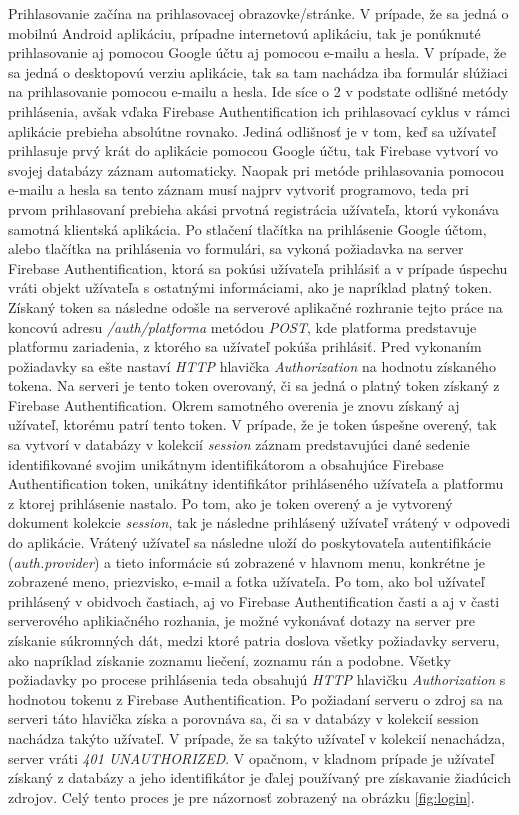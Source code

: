 Prihlasovanie začína na prihlasovacej obrazovke/stránke. V prípade, že sa jedná o mobilnú Android aplikáciu, prípadne internetovú aplikáciu, tak je ponúknuté prihlasovanie aj pomocou Google účtu aj pomocou e-mailu a hesla. V prípade, že sa jedná o desktopovú verziu aplikácie, tak sa tam nachádza iba formulár slúžiaci na prihlasovanie pomocou e-mailu a hesla. Ide síce o 2 v podstate odlišné metódy prihlásenia, avšak vďaka Firebase Authentification ich prihlasovací cyklus v rámci aplikácie prebieha absolútne rovnako. Jediná odlišnosť je v tom, keď sa užívateľ prihlasuje prvý krát do aplikácie pomocou Google účtu, tak Firebase vytvorí vo svojej databázy záznam automaticky. Naopak pri metóde prihlasovania pomocou e-mailu a hesla sa tento záznam musí najprv vytvoriť programovo, teda pri prvom prihlasovaní prebieha akási prvotná registrácia užívateľa, ktorú vykonáva samotná klientská aplikácia. Po stlačení tlačítka na prihlásenie Google účtom, alebo tlačítka na prihlásenia vo formulári, sa vykoná požiadavka na server Firebase Authentification, ktorá sa pokúsi užívateľa prihlásiť a v prípade úspechu vráti objekt užívateľa s ostatnými informáciami, ako je napríklad platný token. Získaný token sa následne odošle na serverové aplikačné rozhranie tejto práce na koncovú adresu \textit{/auth/platforma} metódou \textit{POST}, kde platforma predstavuje platformu zariadenia, z ktorého sa užívateľ pokúša prihlásiť. Pred vykonaním požiadavky sa ešte nastaví \textit{HTTP} hlavička \textit{Authorization} na hodnotu získaného tokena. Na serveri je tento token overovaný, či sa jedná o platný token získaný z Firebase Authentification. Okrem samotného overenia je znovu získaný aj užívateľ, ktorému patrí tento token. V prípade, že je token úspešne overený, tak sa vytvorí v databázy v kolekcií \textit{session} záznam predstavujúci dané sedenie identifikované svojim unikátnym identifikátorom a obsahujúce Firebase Authentification token, unikátny identifikátor prihláseného užívateľa a platformu z ktorej prihlásenie nastalo. Po tom, ako je token overený a je vytvorený dokument kolekcie \textit{session}, tak je následne prihlásený užívateľ vrátený v odpovedi do aplikácie. Vrátený užívateľ sa následne uloží do poskytovateľa autentifikácie (\textit{auth.provider}) a tieto informácie sú zobrazené v hlavnom menu, konkrétne je zobrazené meno, priezvisko, e-mail a fotka užívateľa. Po tom, ako bol užívateľ prihlásený v obidvoch častiach, aj vo Firebase Authentification časti a aj v časti serverového aplikiačného rozhania, je možné vykonávať dotazy na server pre získanie súkromných dát, medzi ktoré patria doslova všetky požiadavky serveru, ako napríklad získanie zoznamu liečení, zoznamu rán a podobne. Všetky požiadavky po procese prihlásenia teda obsahujú \textit{HTTP} hlavičku \textit{Authorization} s hodnotou tokenu z Firebase Authentification. Po požiadaní serveru o zdroj sa na serveri táto hlavička získa a porovnáva sa, či sa v databázy v kolekcií session nachádza takýto užívateľ. V prípade, že sa takýto užívateľ v kolekcií nenachádza, server vráti \textit{401 UNAUTHORIZED}. V opačnom, v kladnom prípade je užívateľ získaný z databázy a jeho identifikátor je ďalej používaný pre získavanie žiadúcich zdrojov. Celý tento proces je pre názornosť zobrazený na obrázku \ref{fig:login}. 
